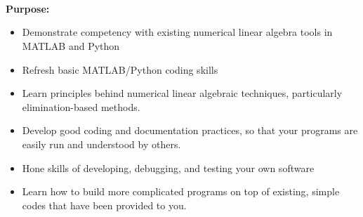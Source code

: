 \documentclass{article}
\begin{document}
~\\~\\~\\
\textbf{Purpose:}  
\begin{itemize}
  \item Demonstrate competency with existing numerical linear algebra tools in MATLAB and Python
  \item Refresh basic MATLAB/Python coding skills
  \item Learn principles behind numerical linear algebraic techniques, particularly elimination-based methods.  
  \item Develop good coding and documentation practices, so that your programs are easily run and understood by others.  
  \item Hone skills of developing, debugging, and testing your own software
  \item Learn how to build more complicated programs on top of existing, simple codes that have been provided to you.
\end{itemize}

\pagebreak
\end{document}
